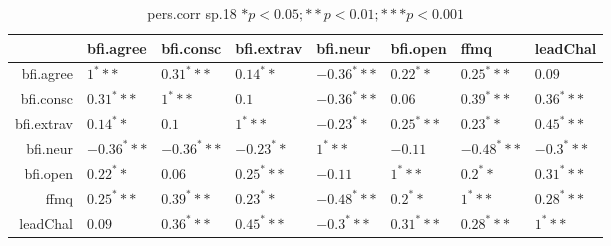 \begin{table}[ht]
\centering
\begin{tabular}{rlllllll}
  \hline
 & bfi.agree & bfi.consc & bfi.extrav & bfi.neur & bfi.open & ffmq & leadChal \\ 
  \hline
bfi.agree & $1^***$ & $0.31^***$ & $0.14^**$ & $-0.36^***$ & $0.22^**$ & $0.25^***$ & $0.09$ \\ 
  bfi.consc & $0.31^***$ & $1^***$ & $0.1$ & $-0.36^***$ & $0.06$ & $0.39^***$ & $0.36^***$ \\ 
  bfi.extrav & $0.14^**$ & $0.1$ & $1^***$ & $-0.23^**$ & $0.25^***$ & $0.23^**$ & $0.45^***$ \\ 
  bfi.neur & $-0.36^***$ & $-0.36^***$ & $-0.23^**$ & $1^***$ & $-0.11$ & $-0.48^***$ & $-0.3^***$ \\ 
  bfi.open & $0.22^**$ & $0.06$ & $0.25^***$ & $-0.11$ & $1^***$ & $0.2^**$ & $0.31^***$ \\ 
  ffmq & $0.25^***$ & $0.39^***$ & $0.23^**$ & $-0.48^***$ & $0.2^**$ & $1^***$ & $0.28^***$ \\ 
  leadChal & $0.09$ & $0.36^***$ & $0.45^***$ & $-0.3^***$ & $0.31^***$ & $0.28^***$ & $1^***$ \\ 
   \hline
\end{tabular}
\caption{pers.corr sp.18 $* p < 0.05; ** p < 0.01; *** p < 0.001$} 
\end{table}
